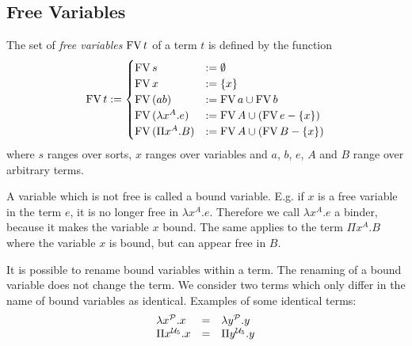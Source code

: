 \subsection{Free Variables}

\begin{definition}
    The set of \emph{free variables} $\FV t$ of a term $t$ is defined by the function
    $$
    \FV t :=
        \begin{cases}
            \FV s &:= \emptyset

            \\

            \FV x &:= \{ x \}

            \\

            \FV (a b) &:= \FV a \cup \FV b

            \\

            \FV (\lambda x^A. e) &:= \FV A \cup (\FV e - \{x\})

            \\

            \FV (\Pi x^A. B) &:= \FV A \cup (\FV B - \{x\})
        \end{cases}
    $$
    where $s$ ranges over sorts, $x$ ranges over variables and $a$, $b$,
    $e$, $A$ and $B$ range over arbitrary terms.
\end{definition}

A variable which is not free is called a bound variable. E.g. if $x$ is a free
variable in the term $e$, it is no longer free in $\lambda x^A. e$. Therefore we
call $\lambda x^A. e$ a binder, because it makes the variable $x$ bound. The
same applies to the term $\Pi x^A. B$  where the variable $x$ is bound, but can
appear free in $B$.


It is possible to rename bound variables within a term. The renaming of a bound
variable does not change the term. We consider two terms which only differ in
the name of bound variables as identical. Examples of some identical terms:
$$
\begin{array}{lll}
    \lambda x^\Prop. x  &=& \lambda y^\Prop. y

    \\

    \Pi x^{\Any_5}. x   &=& \Pi y^{\Any_5}. y
\end{array}
$$



